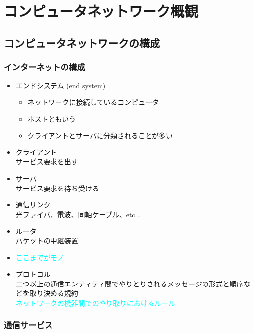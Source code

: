 \section{コンピュータネットワーク概観}

\subsection{コンピュータネットワークの構成}

\subsubsection{インターネットの構成}

\begin{itemize}
  \item エンドシステム (end system)
  \begin{itemize}
    \item ネットワークに接続しているコンピュータ
    \item ホストともいう
    \item クライアントとサーバに分類されることが多い
  \end{itemize}
  \item クライアント\\
    サービス要求を出す
  \item サーバ\\
    サービス要求を待ち受ける
  \item 通信リンク\\
    光ファイバ、電波、同軸ケーブル、etc...
  \item ルータ\\
    パケットの中継装置
  \item \textcolor{cyan}{ここまでがモノ}
  \item プロトコル\\
    二つ以上の通信エンティティ間でやりとりされるメッセージの形式と順序などを取り決める規約\\
    \textcolor{cyan}{ネットワークの機器間でのやり取りにおけるルール}
\end{itemize}

\newpage
\subsubsection{通信サービス}

